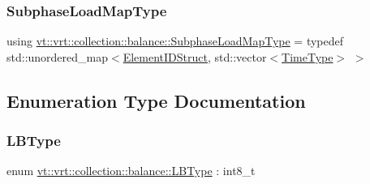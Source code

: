 \mbox{\label{namespacevt_1_1vrt_1_1collection_1_1balance_a8bdadb2583f128dd256e7d5a10826542}} 
\subsubsection{\texorpdfstring{Subphase\+Load\+Map\+Type}{SubphaseLoadMapType}}
{\footnotesize\ttfamily using \hyperlink{namespacevt_1_1vrt_1_1collection_1_1balance_a8bdadb2583f128dd256e7d5a10826542}{vt\+::vrt\+::collection\+::balance\+::\+Subphase\+Load\+Map\+Type} = typedef std\+::unordered\+\_\+map$<$\hyperlink{namespacevt_1_1vrt_1_1collection_1_1balance_a9f5b53fafb270212279a4757d2c4cd28}{Element\+I\+D\+Struct}, std\+::vector$<$\hyperlink{namespacevt_a876a9d0cd5a952859c72de8a46881442}{Time\+Type}$>$ $>$}



\subsection{Enumeration Type Documentation}
\mbox{\label{namespacevt_1_1vrt_1_1collection_1_1balance_ac4f99693509affcc67db182d4aad9b5c}} 
\subsubsection{\texorpdfstring{L\+B\+Type}{LBType}}
{\footnotesize\ttfamily enum \hyperlink{namespacevt_1_1vrt_1_1collection_1_1balance_ac4f99693509affcc67db182d4aad9b5c}{vt\+::vrt\+::collection\+::balance\+::\+L\+B\+Type} \+: int8\+\_\+t\hspace{0.3cm}{\ttfamily [strong]}}


